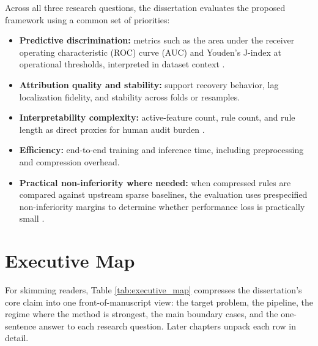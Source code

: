 Across all three research questions, the dissertation evaluates the proposed framework using a common set of priorities:
\begin{itemize}
    \item \textbf{Predictive discrimination:} metrics such as the area under the receiver operating characteristic (ROC) curve (AUC) and Youden's J-index at operational thresholds, interpreted in dataset context \autocites{JOrender2025Efficient,shin2020,sigillito1989}.
    \item \textbf{Attribution quality and stability:} support recovery behavior, lag localization fidelity, and stability across folds or resamples.
    \item \textbf{Interpretability complexity:} active-feature count, rule count, and rule length as direct proxies for human audit burden \autocites{WJMurdoch2019Definitions,EAngelino2018Learning}.
    \item \textbf{Efficiency:} end-to-end training and inference time, including preprocessing and compression overhead.
    \item \textbf{Practical non-inferiority where needed:} when compressed rules are compared against upstream sparse baselines, the evaluation uses prespecified non-inferiority margins to determine whether performance loss is practically small \autocite{DJSchuirmann1987comparison}.
\end{itemize}

\section{Executive Map}

For skimming readers, Table \ref{tab:executive_map} compresses the dissertation's core claim into one front-of-manuscript view: the target problem, the pipeline, the regime where the method is strongest, the main boundary cases, and the one-sentence answer to each research question. Later chapters unpack each row in detail.

